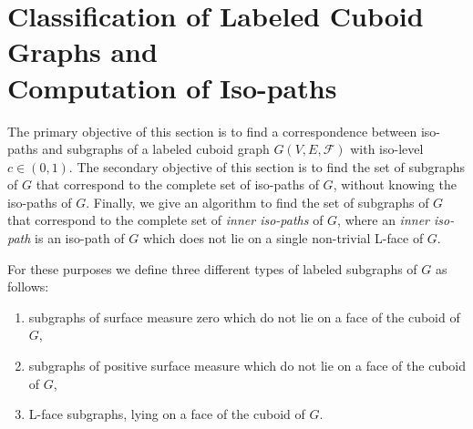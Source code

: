 \documentclass[a4paper,11pt]{article}
\begin{document}
\section{Classification of Labeled Cuboid Graphs and\\ Computation of Iso-paths}
The primary objective of this section is to find a correspondence between iso-paths and subgraphs
of a labeled cuboid graph $G(V,E,\mathcal{F})$ with iso-level $c\in (0,1)$. The secondary objective
of this section is to find the set of subgraphs of $G$ that correspond to the complete set of iso-paths
of $G$, without knowing the iso-paths of $G$. Finally, we give an algorithm to find the set of subgraphs
of $G$ that correspond to the complete set of {\it inner iso-paths} of $G$, where an {\it inner iso-path}
is  an iso-path of $G$ which does not lie on a single non-trivial L-face of $G$.

For these purposes we define three different types of labeled subgraphs of $G$ as follows:
\begin{enumerate}
\item subgraphs of surface measure zero which do not lie on a face of the cuboid of $G$,
\item subgraphs of positive surface measure which do not lie on a face of the cuboid of $G$,
\item L-face subgraphs, lying on a face of the cuboid of $G$.
\end{enumerate}
\end{document}

